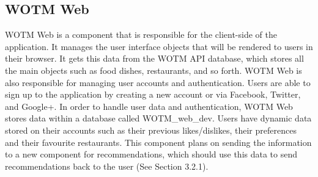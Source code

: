 \subsection{WOTM Web}

WOTM Web is a component that is responsible for the client-side of the application. It manages the user interface objects that will be rendered to users in their browser. It gets this data from the WOTM API database, which stores all the main objects such as food dishes, restaurants, and so forth. WOTM Web is also responsible for managing user accounts and authentication. Users are able to sign up to the application by creating a new account or via Facebook, Twitter, and Google+. In order to handle user data and authentication, WOTM Web stores data within a database called WOTM\_web\_dev. Users have dynamic data stored on their accounts such as their previous likes/dislikes, their preferences and their favourite restaurants. This component plans on sending the information to a new component for recommendations, which should use this data to send recommendations back to the user (See Section 3.2.1). 


